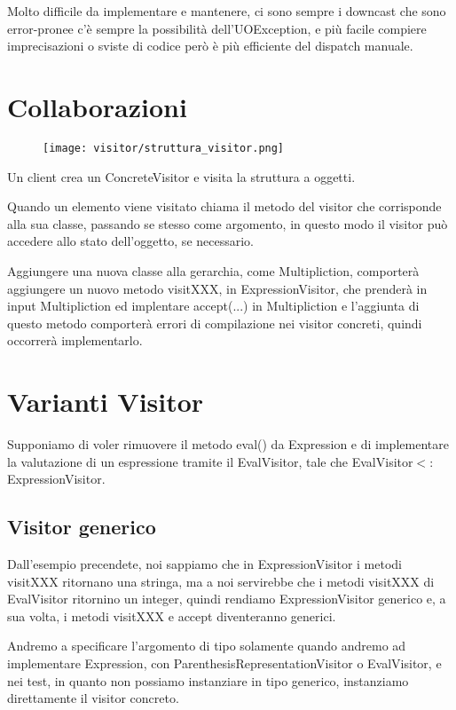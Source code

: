Molto difficile da implementare e mantenere, ci sono sempre i downcast che sono error-pronee c’è sempre la possibilità dell’UOException, e più facile compiere 
imprecisazioni o sviste di codice però è più efficiente del dispatch manuale.

\section{Collaborazioni}

\begin{figure}[H]
  \centering
  \texttt{[image: visitor/struttura\_visitor.png]}
\end{figure}

Un client crea un ConcreteVisitor e visita la struttura a oggetti.

Quando un elemento viene visitato chiama il metodo del visitor che corrisponde alla sua classe, passando se stesso come argomento, in questo modo il visitor può 
accedere allo stato dell’oggetto, se necessario.
\smallskip

Aggiungere una nuova classe alla gerarchia, come Multipliction, comporterà aggiungere un nuovo metodo visitXXX, in ExpressionVisitor, che prenderà in input 
Multipliction ed implentare accept(...) in Multipliction e l'aggiunta di questo metodo comporterà errori di compilazione nei visitor concreti, quindi occorrerà 
implementarlo.

\section{Varianti Visitor}

Supponiamo di voler rimuovere il metodo eval() da Expression e di implementare la valutazione di un espressione tramite il EvalVisitor, tale che 
EvalVisitor$<:$ExpressionVisitor.

\subsection{Visitor generico}

Dall'esempio precendete, noi sappiamo che in ExpressionVisitor i metodi visitXXX ritornano una stringa, ma a noi servirebbe che i metodi visitXXX di EvalVisitor 
ritornino un integer, quindi rendiamo ExpressionVisitor generico e, a sua volta, i metodi visitXXX e accept diventeranno generici.

Andremo a specificare l'argomento di tipo solamente quando andremo ad implementare Expression, con ParenthesisRepresentationVisitor o EvalVisitor, e nei test, in quanto
non possiamo instanziare in tipo generico, instanziamo direttamente il visitor concreto.

